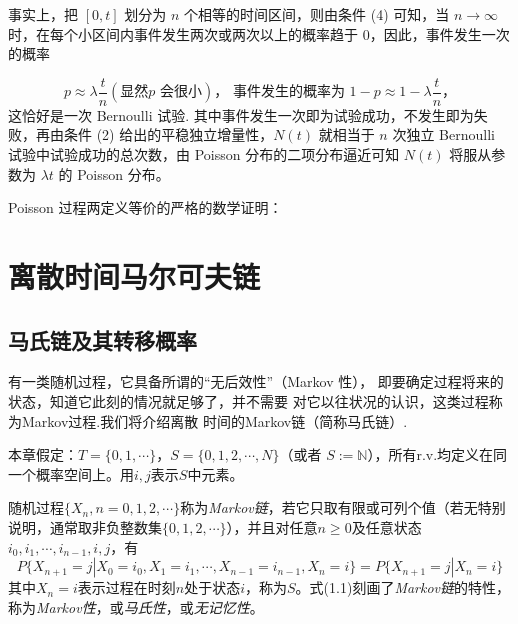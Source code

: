 \documentclass[lang=cn,10pt,thmcnt=section]{elegantbook}
\begin{document}
事实上，把 $[0, t]$ 划分为 $n$ 个相等的时间区间，则由条件 (4) 可知，当 $n \rightarrow \infty$ 时，在每个小区间内事件发生两次或两次以上的概率趋于 0，因此，事件发生一次的概率

\[
p \approx \lambda \frac{t}{n} (\text{显然} p \text{ 会很小})，\text{ 事件发生的概率为 } 1 - p \approx 1 - \lambda \frac{t}{n}，
\]
这恰好是一次 Bernoulli 试验. 其中事件发生一次即为试验成功，不发生即为失败，再由条件 (2) 给出的平稳独立增量性，$N(t)$ 就相当于 $n$ 次独立 Bernoulli 试验中试验成功的总次数，由 Poisson 分布的二项分布逼近可知 $N(t)$ 将服从参数为 $\lambda t$ 的 Poisson 分布。

Poisson 过程两定义等价的严格的数学证明：

















\chapter{离散时间马尔可夫链}

\section{马氏链及其转移概率}
	有一类随机过程，它具备所谓的“无后效性”（Markov 性），
即要确定过程将来的状态，知道它此刻的情况就足够了，并不需要
对它以往状况的认识，这类过程称为Markov过程.我们将介绍离散
时间的Markov链（简称马氏链）.

本章假定：$T = \{0, 1, \cdots\}$，$S = \{0, 1, 2, \cdots, N\}$（或者 $S := $），所有r.v.均定义在同一个概率空间上。用$i, j$表示$S$中元素。
\begin{definition}[离散时间马尔可夫链]
	随机过程$\{X_n, n = 0, 1, 2, \cdots\}$称为\textit{Markov链}，若它只取有限或可列个值（若无特别说明，通常取非负整数集$\{0, 1, 2, \cdots\}$），并且对任意$n $及任意状态$i_0, i_1, \cdots, i_{n-1}, i, j$，有
\begin{equation}
P\{X_{n+1} = j | X_0 = i_0, X_1 = i_1, \cdots, X_{n-1} = i_{n-1}, X_n = i\} = P\{X_{n+1} = j | X_n = i\}
\end{equation}
其中$X_n = i$表示过程在时刻$n$处于状态$i$，称为$S$。式(1.1)刻画了\textit{Markov链}的特性，称为\textit{Markov性}，或\textit{马氏性}，或\textit{无记忆性}。
\end{definition}
\end{document}

